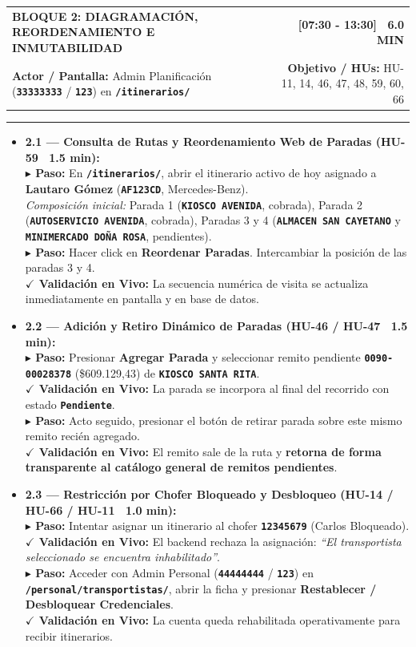 \documentclass[a4paper,9pt]{article}
\makeatletter
\newcommand{\stepact}[1]{\textbf{$\blacktriangleright$ Paso:} #1}
\newcommand{\valact}[1]{\textbf{$\checkmark$ Validación en Vivo:} #1}
\newcommand{\codeb}[1]{\texttt{\bfseries #1}}
\newcommand{\blockheader}[4]{%
  \begin{tabularx}{\textwidth}{@{}X r@{}}
    {\fontsize{10.5pt}{12.5pt}\selectfont\textbf{#1}} & {\normalsize\textbf{#2}} \\
    {\footnotesize\textbf{Actor / Pantalla:} #3} & {\footnotesize\textbf{Objetivo / HUs:} #4}
  \end{tabularx}%
  \vspace{-2pt}\hrule\vspace{3.5pt}%
}
\makeatother
\begin{document}
\begin{tcolorbox}[cardframe, top=3pt, bottom=3pt, left=6pt, right=6pt]
\blockheader{BLOQUE 2: DIAGRAMACIÓN, REORDENAMIENTO E INMUTABILIDAD}{[07:30 - 13:30] \textbar\ 6.0 MIN}{Admin Planificación (\codeb{33333333} / \codeb{123}) en \codeb{/itinerarios/}}{HU-11, 14, 46, 47, 48, 59, 60, 66}

{\small
\begin{itemize}[leftmargin=11pt, itemsep=4pt]

\item \textbf{2.1 — Consulta de Rutas y Reordenamiento Web de Paradas (HU-59 \textbar\ 1.5 min):} \\
\stepact{En \codeb{/itinerarios/}, abrir el itinerario activo de hoy asignado a \textbf{Lautaro Gómez} (\codeb{AF123CD}, Mercedes-Benz).} \\
\textit{Composición inicial:} Parada 1 (\codeb{KIOSCO AVENIDA}, cobrada), Parada 2 (\codeb{AUTOSERVICIO AVENIDA}, cobrada), Paradas 3 y 4 (\codeb{ALMACEN SAN CAYETANO} y \codeb{MINIMERCADO DOÑA ROSA}, pendientes). \\
\stepact{Hacer click en \textbf{Reordenar Paradas}. Intercambiar la posición de las paradas 3 y 4.} \\
\valact{La secuencia numérica de visita se actualiza inmediatamente en pantalla y en base de datos.}

\item \textbf{2.2 — Adición y Retiro Dinámico de Paradas (HU-46 / HU-47 \textbar\ 1.5 min):} \\
\stepact{Presionar \textbf{Agregar Parada} y seleccionar remito pendiente \codeb{0090-00028378} (\$609.129,43) de \codeb{KIOSCO SANTA RITA}.} \\
\valact{La parada se incorpora al final del recorrido con estado \codeb{Pendiente}.} \\
\stepact{Acto seguido, presionar el botón de retirar parada sobre este mismo remito recién agregado.} \\
\valact{El remito sale de la ruta y \textbf{retorna de forma transparente al catálogo general de remitos pendientes}.}

\item \textbf{2.3 — Restricción por Chofer Bloqueado y Desbloqueo (HU-14 / HU-66 / HU-11 \textbar\ 1.0 min):} \\
\stepact{Intentar asignar un itinerario al chofer \codeb{12345679} (Carlos Bloqueado).} \\
\valact{El backend rechaza la asignación: \textit{``El transportista seleccionado se encuentra inhabilitado''}.} \\
\stepact{Acceder con Admin Personal (\codeb{44444444} / \codeb{123}) en \codeb{/personal/transportistas/}, abrir la ficha y presionar \textbf{Restablecer / Desbloquear Credenciales}.} \\
\valact{La cuenta queda rehabilitada operativamente para recibir itinerarios.}


\end{itemize}}
\end{tcolorbox}
\end{document}
